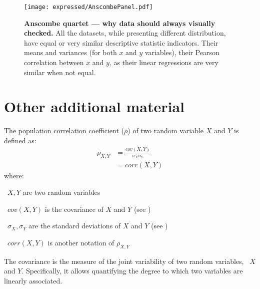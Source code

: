 
\begin{figure}[!ht]
    \texttt{[image: expressed/AnscombePanel.pdf]}\centering
    \caption[Anscombe quartet --- why data should always visualy checked]
    {\label{fig:Anscombe}\textbf{Anscombe quartet --- why data should always
    visually checked.}\smallbreak{} All the datasets, while presenting
    different distribution, have equal or very similar descriptive statistic
    indicators. Their means and variances (for both $x$ and $y$ variables),
    their Pearson correlation between $x$ and $y$,
    as their linear regressions are very similar when not equal.}
\end{figure}


\section{Other additional material}


The population correlation coefficient ($\rho$) of two random variable $X$ and $Y$
is defined as:
\begin{equation}\label{eq:PearsonPopCor}
     \tag{Population correlation coefficient}
     \begin{split}
         \rho_{X,Y} & = \frac{cov(X,Y)}{\sigma_X \sigma_Y}\\
                    & = corr(X,Y)
     \end{split}
\end{equation}
where:
\quad\begin{eqlist}
    \item[\textbullet\ $X,Y$] are two random variables
    \item[\textbullet\ $cov(X,Y)$] is the covariance of $X$ and $Y$
        (see )
    \item[\textbullet\ $\sigma_{X},\sigma_{Y}$] are the standard deviations
        of $X$ and $Y$ (see )
    \item[\textbullet\ $corr(X,Y)$] is another notation of $\rho_{X,Y}$
\end{eqlist}

The covariance is the measure of the joint variability of two random variables,
\eg\ $X$ and $Y$.
Specifically, it allows quantifying the degree to which
two variables are linearly associated.

